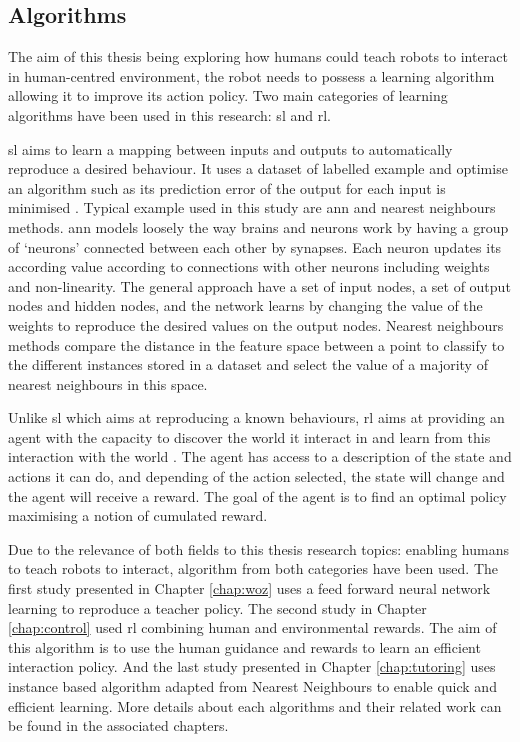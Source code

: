 \subsection{Algorithms}

The aim of this thesis being exploring how humans could teach robots to interact in  human-centred environment, the robot needs to possess a learning algorithm allowing it to improve its action policy. Two main categories of learning algorithms have been used in this research: \gls{sl} and \gls{rl}.

\gls{sl} aims to learn a mapping between inputs and outputs to automatically reproduce a desired behaviour. It uses a dataset of labelled example and optimise an algorithm such as its prediction error of the output for each input is minimised \citep{russell2016artificial}. Typical example used in this study are \gls{ann} and nearest neighbours methods. \gls{ann} models loosely the way brains and neurons work by having a group of `neurons' connected between each other by synapses. Each neuron updates its according value according to connections with other neurons including weights and non-linearity. The general approach have a set of input nodes, a set of output nodes and hidden nodes, and the network learns by changing the value of the weights to reproduce the desired values on the output nodes. Nearest neighbours methods compare the distance in the feature space between a point to classify to the different instances stored in a dataset and select the value of a majority of nearest neighbours in this space.

Unlike \gls{sl} which aims at reproducing a known behaviours, \gls{rl} aims at providing an agent with the capacity to discover the world it interact in and learn from this interaction with the world \citep{sutton1998reinforcement}. The agent has access to a description of the state and actions it can do, and depending of the action selected, the state will change and the agent will receive a reward. The goal of the agent is to find an optimal policy maximising a notion of cumulated reward.

Due to the relevance of both fields to this thesis research topics: enabling humans to teach robots to interact, algorithm from both categories have been used. The first study presented in Chapter \ref{chap:woz} uses a feed forward neural network learning to reproduce a teacher policy. The second study in Chapter \ref{chap:control} used \acrlong{rl} combining human and environmental rewards. The aim of this algorithm is to use the human guidance and rewards to learn an efficient interaction policy. And the last study presented in Chapter \ref{chap:tutoring} uses instance based algorithm adapted from Nearest Neighbours to enable quick and efficient learning. More details about each algorithms and their related work can be found in the associated chapters.


